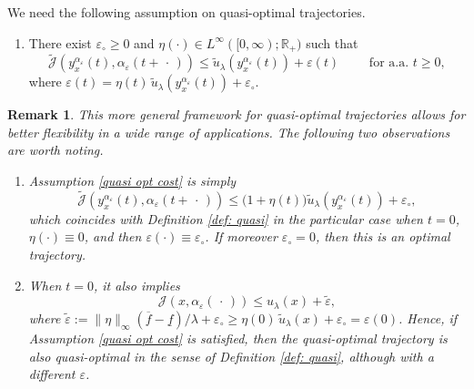 \documentclass[12pt]{amsart}
\numberwithin{equation}{section}
\theoremstyle{plain}
\newtheorem{remark}[theorem]{Remark}
\begin{document}
We need the following assumption on quasi-optimal trajectories. 

\begin{enumerate}[label=\textbf{(C)}]
    \item\label{quasi opt cost} There exist $\varepsilon_{\circ}\geq 0$ and $\eta(\cdot)\in L^{\infty}([0,\infty);\mathbb{R}_{+})$ 
    such that
    \begin{equation*}
       \widetilde{\mathscr{J}}(y_{x}^{\alpha_{\varepsilon}}(t),\alpha_{\varepsilon}(t+\,\cdot\,)) \leq \tilde{u}_{\lambda}(y_{x}^{\alpha_{\varepsilon}}(t)) + \varepsilon(t) \quad \quad \text{ for a.a. } t\geq 0,
    \end{equation*} 
    where $\varepsilon(t) = \eta(t)\,\tilde{u}_{\lambda}(y_{x}^{\alpha_{\varepsilon}}(t)) + \varepsilon_{\circ}$.
\end{enumerate}

\begin{remark} \label{rem: (C)}
This more general framework for quasi-optimal trajectories allows for better flexibility in a wide range of applications. The following two observations are worth noting.
\begin{enumerate}
    \item Assumption \ref{quasi opt cost} is simply
    \begin{equation*}
       \widetilde{\mathscr{J}}(y_{x}^{\alpha_{\varepsilon}}(t),\alpha_{\varepsilon}(t+\,\cdot\,)) \leq \big(1+\eta(t)\big)\tilde{u}_{\lambda}(y_{x}^{\alpha_{\varepsilon}}(t)) + \varepsilon_{\circ},
    \end{equation*}
    which coincides with Definition \ref{def: quasi} in the particular case when $t=0$, $\eta(\cdot)\equiv 0$, and then $\varepsilon(\cdot)\equiv \varepsilon_{\circ}$. If moreover $\varepsilon_{\circ}=0$, then this is an optimal trajectory. 
    \item When $t=0$, it also implies 
    \begin{equation*}
       {\mathscr{J}}(x,\alpha_{\varepsilon}(\,\cdot\,)) \leq {u}_{\lambda}(x) + \tilde{\varepsilon} ,
    \end{equation*} 
    where $\tilde{\varepsilon} := \|\eta\|_{\infty}(\overline{f}-\underline{f})/\lambda + \varepsilon_{\circ} \geq \eta(0)\,\tilde{u}_{\lambda}(x) + \varepsilon_{\circ} = \varepsilon(0)$. Hence, if Assumption \ref{quasi opt cost} is satisfied, then the quasi-optimal trajectory is also quasi-optimal in the sense of Definition \ref{def: quasi}, although with a different $\varepsilon$.
\end{enumerate}

\end{remark}
\end{document}
